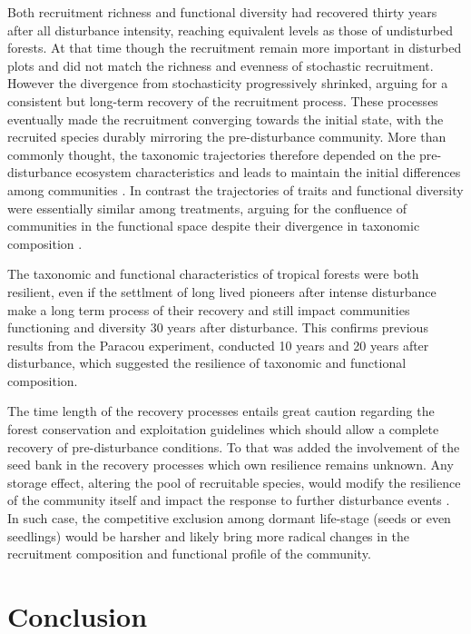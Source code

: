 \documentclass[fleqn,10pt]{ArtEcoFoG} %
\begin{document}
Both recruitment richness and functional diversity had recovered thirty
years after all disturbance intensity, reaching equivalent levels as
those of undisturbed forests. At that time though the recruitment remain
more important in disturbed plots and did not match the richness and
evenness of stochastic recruitment. However the divergence from
stochasticity progressively shrinked, arguing for a consistent but
long-term recovery of the recruitment process. These processes
eventually made the recruitment converging towards the initial state,
with the recruited species durably mirroring the pre-disturbance
community. More than commonly thought, the taxonomic trajectories
therefore depended on the pre-disturbance ecosystem characteristics and
leads to maintain the initial differences among communities
\citep{Anderson2007, Herault2018}. In contrast the trajectories of
traits and functional diversity were essentially similar among
treatments, arguing for the confluence of communities in the functional
space despite their divergence in taxonomic composition
\citep{Fukami2005}.

The taxonomic and functional characteristics of tropical forests were
both resilient, even if the settlment of long lived pioneers after
intense disturbance make a long term process of their recovery and still
impact communities functioning and diversity 30 years after disturbance.
This confirms previous results from the Paracou experiment, conducted 10
years \citep{Molino2001} and 20 years \citep{Baraloto2012a} after
disturbance, which suggested the resilience of taxonomic and functional
composition.

The time length of the recovery processes entails great caution
regarding the forest conservation and exploitation guidelines which
should allow a complete recovery of pre-disturbance conditions. To that
was added the involvement of the seed bank in the recovery processes
which own resilience remains unknown. Any storage effect, altering the
pool of recruitable species, would modify the resilience of the
community itself and impact the response to further disturbance events
\citep{Norden2009}. In such case, the competitive exclusion among
dormant life-stage (seeds or even seedlings) would be harsher and likely
bring more radical changes in the recruitment composition and functional
profile of the community.

\section{Conclusion}\label{conclusion}
\end{document}
